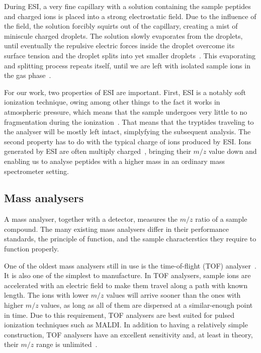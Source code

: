During ESI, a very fine capillary with a solution containing the sample peptides and charged ions is placed into a strong electrostatic field. Due to the influence of the field, the solution forcibly squirts out of the capillary, creating a mist of miniscule charged droplets. The solution slowly evaporates from the droplets, until eventually the repulsive electric forces inside the droplet overcome its surface tension and the droplet splits into yet smaller droplets~\cite{rayleigh1882xx}. This evaporating and splitting process repeats itself, until we are left with isolated sample ions in the gas phase~\cite{dole1968molecular,dole1968gas,fenn1989electrospray, fenn1990electrospray}.


For our work, two properties of ESI are important. First, ESI is a notably soft ionization technique, owing among other things to the fact it works in atmospheric pressure, which means that the sample undergoes very little to no fragmentation during the ionization~\cite{griffiths2001electrospray}. That means that the tryptides traveling to the analyser will be mostly left intact, simplyfying the subsequent analysis. The second property has to do with the typical charge of ions produced by ESI\@. Ions generated by ESI are often multiply charged~\cite{felitsyn2002origin}, bringing their \(m/z\) value down and enabling us to analyse peptides with a higher mass in an ordinary mass spectrometer setting.

\subsection{Mass analysers}

A mass analyser, together with a detector, measures the \(m/z\) ratio of a sample compound. The many existing mass analysers differ in their performance standards, the principle of function, and the sample characterstics they require to function properly.

One of the oldest mass analysers still in use is the time-of-flight (TOF) analyser~\cite{stephens1946pulsed}. It is also one of the simplest to manufacture. In TOF analysers, sample ions are accelerated with an electric field to make them travel along a path with known length. The ions with lower \(m/z\) values will arrive sooner than the ones with higher \(m/z\) values, as long as all of them are dispersed at a similar-enough point in time. Due to this requirement, TOF analysers are best suited for pulsed ionization techniques such as MALDI\@. In addition to having a relatively simple construction, TOF analysers have an excellent sensitivity and, at least in theory, their \(m/z\) range is unlimited~\cite{fuerstenau1995molecular}.

